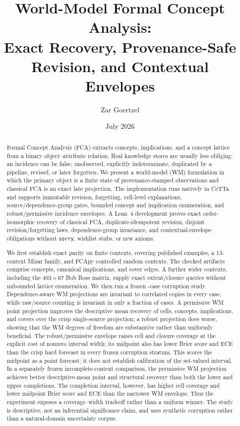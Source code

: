 \documentclass[11pt]{article}
\title{World-Model Formal Concept Analysis:\\
Exact Recovery, Provenance-Safe Revision, and Contextual Envelopes}
\author{Zar Goertzel}
\date{July 2026}
\newcommand{\code}[1]{\nolinkurl{#1}}
\begin{document}
\maketitle

\begin{abstract}
Formal Concept Analysis (FCA) extracts concepts, implications, and a concept
lattice from a binary object--attribute relation. Real knowledge stores are
usually less obliging: an incidence can be false, unobserved, explicitly
indeterminate, duplicated by a pipeline, revised, or later forgotten. We
present a world-model (WM) formulation in which the primary object is a finite
state of provenance-stamped observations and classical FCA is an exact late
projection. The implementation runs natively in CeTTa and supports immutable
revision, forgetting, cell-level explanations, source/dependence-group gates,
bounded concept and implication enumeration, and robust/permissive incidence
envelopes. A Lean~4 development proves exact order-isomorphic recovery of
classical FCA, duplicate-idempotent revision, disjoint revision/forgetting
laws, dependence-group invariance, and contextual-envelope obligations without
\code{sorry}, wishlist stubs, or new axioms.

We first establish exact parity on \WMFCAExactContextCount{} finite contexts,
covering published examples, a 13-context Mizar family, and FCApy controlled
random contexts. The checked artifacts comprise \WMFCAExactConceptCount{}
concepts, \WMFCAExactBasisCount{} canonical implications, and
\WMFCAExactCoverCount{} cover edges. A further \WMFCAQueryContextCount{} wider
contexts, including the $403\times67$ Bob Ross matrix, supply
\WMFCAQueryCount{} exact extent/closure queries without unbounded lattice
enumeration. We then run a frozen \WMFCACaseCount{}-case corruption study.
Dependence-aware WM projections are invariant to correlated copies
in every case, while raw/source counting is invariant in only a
\WMFCARawCopyInvariantRate{} fraction of cases. A permissive WM point
projection improves the descriptive mean recovery of cells, concepts,
implications, and covers over the crisp single-source projection; a robust
projection does worse, showing that the WM degrees of freedom are substantive
rather than uniformly beneficial.
The robust/permissive envelope raises cell and closure coverage at the explicit
cost of nonzero interval width; its midpoint also has lower Brier score and ECE
than the crisp hard forecast in every frozen corruption stratum. This scores
the midpoint as a point forecast; it does not establish calibration of the
set-valued interval.
In a separately frozen incomplete-context comparison, the permissive WM
projection achieves better descriptive-mean point and structural recovery than
both the lower and upper completions. The completion interval, however, has higher
cell coverage and lower midpoint Brier score and ECE than the narrower WM
envelope. Thus the experiment exposes a coverage--width tradeoff rather than a
uniform winner.
The study is descriptive, not an inferential significance claim, and uses
synthetic corruption rather than a natural-domain uncertainty corpus.
\end{abstract}
\end{document}
